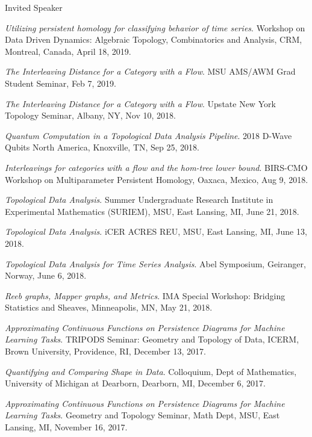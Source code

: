 \documentclass{resume} %
\begin{document}
\begin{rSection}{Invited Speaker}
\begin{etaremune}
\item\emph{Utilizing persistent homology for classifying behavior of time series}. Workshop on Data Driven Dynamics: Algebraic Topology, Combinatorics and Analysis, CRM, Montreal, Canada, April 18, 2019. 

\item\emph{The Interleaving Distance for a Category with a Flow}. MSU AMS/AWM Grad Student Seminar, Feb 7, 2019. 

\item\emph{The Interleaving Distance for a Category with a Flow}. Upstate New York Topology Seminar, Albany, NY, Nov 10, 2018. 

\item\emph{Quantum Computation in a Topological Data Analysis Pipeline}. 2018 D-Wave Qubits North America, Knoxville, TN, Sep 25, 2018. 

\item\emph{Interleavings for categories with a flow and the hom-tree lower bound}. BIRS-CMO Workshop on Multiparameter Persistent Homology, Oaxaca, Mexico, Aug 9, 2018. 

\item\emph{Topological Data Analysis}. Summer Undergraduate Research Institute in Experimental Mathematics (SURIEM), MSU, East Lansing, MI, June 21, 2018. 

\item\emph{Topological Data Analysis}. iCER ACRES REU, MSU, East Lansing, MI, June 13, 2018. 

\item\emph{Topological Data Analysis for Time Series Analysis}. Abel Symposium, Geiranger, Norway, June 6, 2018. 

\item\emph{Reeb graphs, Mapper graphs, and Metrics}. IMA Special Workshop: Bridging Statistics and Sheaves, Minneapolis, MN, May 21, 2018. 

\item\emph{Approximating Continuous Functions on Persistence Diagrams for Machine Learning Tasks}. TRIPODS Seminar: Geometry and Topology of Data, ICERM, Brown University, Providence, RI, December 13, 2017. 

\item\emph{Quantifying and Comparing Shape in Data}. Colloquium, Dept of Mathematics, University of Michigan at Dearborn, Dearborn, MI, December 6, 2017. 

\item\emph{Approximating Continuous Functions on Persistence Diagrams for Machine Learning Tasks}. Geometry and Topology Seminar, Math Dept, MSU, East Lansing, MI, November 16, 2017. 


\end{etaremune}
\end{rSection}
\end{document}
